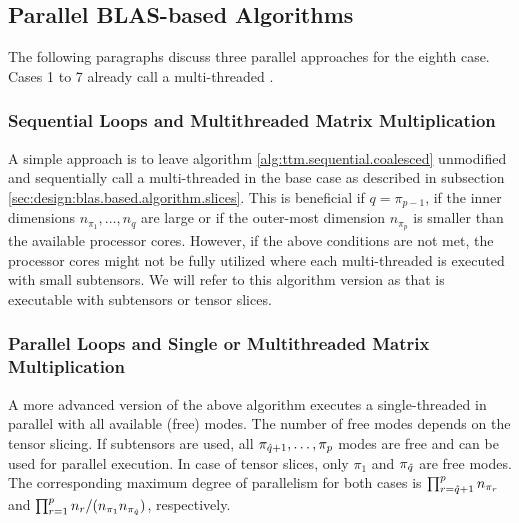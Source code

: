 \subsection{Parallel BLAS-based Algorithms}
\label{subsec:parallel.multi-loops}
The following paragraphs discuss three parallel approaches for the eighth case.
Cases 1 to 7 already call a multi-threaded .
\vspace{-1em}

\subsubsection{Sequential Loops and Multithreaded Matrix Multiplication}
A simple approach is to leave algorithm \ref{alg:ttm.sequential.coalesced} unmodified and sequentially call a multi-threaded  in the base case as described in subsection \ref{sec:design:blas.based.algorithm.slices}.
This is beneficial if $q = \pi_{p-1}$, if the inner dimensions $n_{\pi_1},\dots,n_{q}$ are large or if the outer-most dimension $n_{\pi_{p}}$ is smaller than the available processor cores.
However, if the above conditions are not met, the processor cores might not be fully utilized where each multi-threaded  is executed with small subtensors.
We will refer to this algorithm version as  that is executable with subtensors or tensor slices.
\vspace{-1em}

\subsubsection{Parallel Loops and Single or Multithreaded Matrix Multiplication}
A more advanced version of the above algorithm executes a single-threaded  in parallel with all available (free) modes.
The number of free modes depends on the tensor slicing.
If subtensors are used, all $\pi_{\hat{q}+1}, \dots, \pi_{p}$ modes are free  and can be used for parallel execution.
In case of tensor slices, only $\pi_1$ and $\pi_{\hat{q}}$ are free modes.
The corresponding maximum degree of parallelism for both cases is $\prod_{r=\hat{q}+1}^{p} n_{\pi_r}$ and $\prod_{r=1}^{p} n_{r} / (n_{\pi_1} n_{\pi_{\hat{q}}})$, respectively.



